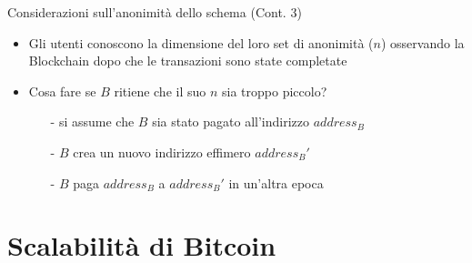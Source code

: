 \documentclass{beamer}
\begin{document}
  \begin{frame}{Considerazioni sull'anonimità dello schema (Cont. 3)}
      \begin{itemize}
          \item Gli utenti conoscono la dimensione del loro set di anonimità ($n$) osservando la Blockchain dopo che le transazioni sono state completate
          \item Cosa fare se $B$ ritiene che il suo $n$ sia troppo piccolo? \pause
          \begin{itemize}
              \item[-] si assume che $B$ sia stato pagato all'indirizzo $address_B$
              \item[-] $B$ crea un nuovo indirizzo effimero $address_B'$
              \item[-] $B$ paga $address_B$ a $address_B'$ in un'altra epoca
          \end{itemize}
      \end{itemize}
  \end{frame}
  
  
  
  
  
  \section{Scalabilità di Bitcoin}
\end{document}
